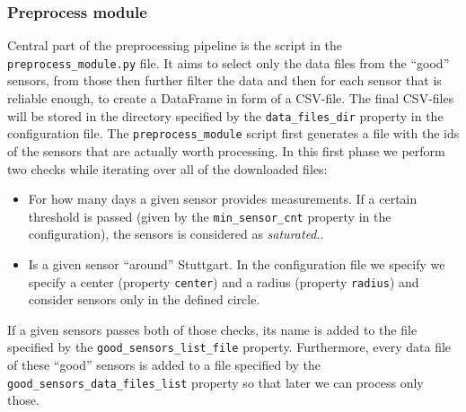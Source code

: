 \documentclass[12pt,a4paper,twoside]{scrartcl}
\numberwithin{equation}{section}
\begin{document}
\subsubsection{Preprocess module}
\label{sec:preproc-module}
Central part of the preprocessing pipeline is the script in the \texttt{preprocess\_module.py} file. It aims to select only the data files from the ``good'' sensors, from those then further filter the data and then for each sensor that is reliable enough, to create a DataFrame in form of a CSV-file. The final CSV-files will be stored in the directory specified by the \texttt{data\_files\_dir} property in the configuration file. The \texttt{preprocess\_module} script first generates a file with the ids of the sensors that are actually worth processing. In this first phase we perform two checks while iterating over all of the downloaded files:
\begin{itemize}
\item For how many days a given sensor provides measurements. If a certain threshold is passed (given by the \texttt{min\_sensor\_cnt} property in the configuration), the sensors is considered as \emph{saturated}..
\item Is a given sensor ``around'' Stuttgart. In the configuration file we specify we specify a center (property \texttt{center}) and a radius (property \texttt{radius}) and consider sensors only in the defined circle.
\end{itemize}
If a given sensors passes both of those checks, its name is added to the file specified by the \texttt{good\_sensors\_list\_file} property. Furthermore, every data file of these ``good'' sensors is added to a file specified by the \texttt{good\_sensors\_data\_files\_list} property so that later we can process only those. 
\end{document}
